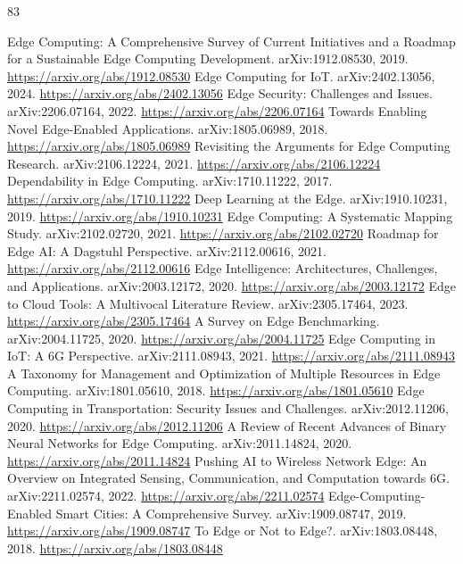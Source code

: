 \documentclass[11pt]{article}
\begin{document}
\begin{thebibliography}{83}
 Edge Computing: A Comprehensive Survey of Current Initiatives and a Roadmap for a Sustainable Edge Computing Development. arXiv:1912.08530, 2019. \url{https://arxiv.org/abs/1912.08530}
 Edge Computing for IoT. arXiv:2402.13056, 2024. \url{https://arxiv.org/abs/2402.13056}
 Edge Security: Challenges and Issues. arXiv:2206.07164, 2022. \url{https://arxiv.org/abs/2206.07164}
 Towards Enabling Novel Edge-Enabled Applications. arXiv:1805.06989, 2018. \url{https://arxiv.org/abs/1805.06989}
 Revisiting the Arguments for Edge Computing Research. arXiv:2106.12224, 2021. \url{https://arxiv.org/abs/2106.12224}
 Dependability in Edge Computing. arXiv:1710.11222, 2017. \url{https://arxiv.org/abs/1710.11222}
 Deep Learning at the Edge. arXiv:1910.10231, 2019. \url{https://arxiv.org/abs/1910.10231}
 Edge Computing: A Systematic Mapping Study. arXiv:2102.02720, 2021. \url{https://arxiv.org/abs/2102.02720}
 Roadmap for Edge AI: A Dagstuhl Perspective. arXiv:2112.00616, 2021. \url{https://arxiv.org/abs/2112.00616}
 Edge Intelligence: Architectures, Challenges, and Applications. arXiv:2003.12172, 2020. \url{https://arxiv.org/abs/2003.12172}
 Edge to Cloud Tools: A Multivocal Literature Review. arXiv:2305.17464, 2023. \url{https://arxiv.org/abs/2305.17464}
 A Survey on Edge Benchmarking. arXiv:2004.11725, 2020. \url{https://arxiv.org/abs/2004.11725}
 Edge Computing in IoT: A 6G Perspective. arXiv:2111.08943, 2021. \url{https://arxiv.org/abs/2111.08943}
 A Taxonomy for Management and Optimization of Multiple Resources in Edge Computing. arXiv:1801.05610, 2018. \url{https://arxiv.org/abs/1801.05610}
 Edge Computing in Transportation: Security Issues and Challenges. arXiv:2012.11206, 2020. \url{https://arxiv.org/abs/2012.11206}
 A Review of Recent Advances of Binary Neural Networks for Edge Computing. arXiv:2011.14824, 2020. \url{https://arxiv.org/abs/2011.14824}
 Pushing AI to Wireless Network Edge: An Overview on Integrated Sensing, Communication, and Computation towards 6G. arXiv:2211.02574, 2022. \url{https://arxiv.org/abs/2211.02574}
 Edge-Computing-Enabled Smart Cities: A Comprehensive Survey. arXiv:1909.08747, 2019. \url{https://arxiv.org/abs/1909.08747}
 To Edge or Not to Edge?. arXiv:1803.08448, 2018. \url{https://arxiv.org/abs/1803.08448}

\end{thebibliography}
\end{document}
